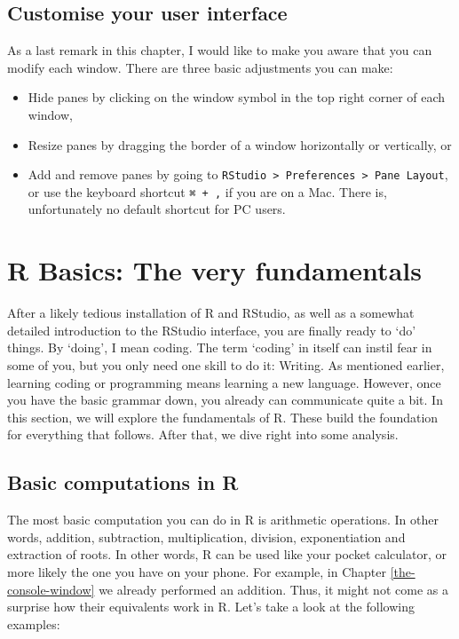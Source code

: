 \documentclass[
]{book}
\begin{document}
\hypertarget{customise-your-user-interface}{%
\section{Customise your user interface}\label{customise-your-user-interface}}

As a last remark in this chapter, I would like to make you aware that you can modify each window. There are three basic adjustments you can make:

\begin{itemize}
\item
  Hide panes by clicking on the window symbol in the top right corner of each window,
\item
  Resize panes by dragging the border of a window horizontally or vertically, or
\item
  Add and remove panes by going to \texttt{RStudio\ \textgreater{}\ Preferences\ \textgreater{}\ Pane\ Layout}, or use the keyboard shortcut \texttt{⌘\ +\ ,} if you are on a Mac. There is, unfortunately no default shortcut for PC users.
\end{itemize}

\hypertarget{r-basics-the-very-fundamentals}{%
\chapter{R Basics: The very fundamentals}\label{r-basics-the-very-fundamentals}}

After a likely tedious installation of R and RStudio, as well as a somewhat detailed introduction to the RStudio interface, you are finally ready to `do' things. By `doing', I mean coding. The term `coding' in itself can instil fear in some of you, but you only need one skill to do it: Writing. As mentioned earlier, learning coding or programming means learning a new language. However, once you have the basic grammar down, you already can communicate quite a bit. In this section, we will explore the fundamentals of R. These build the foundation for everything that follows. After that, we dive right into some analysis.

\hypertarget{basic-computations-in-r}{%
\section{Basic computations in R}\label{basic-computations-in-r}}

The most basic computation you can do in R is arithmetic operations. In other words, addition, subtraction, multiplication, division, exponentiation and extraction of roots. In other words, R can be used like your pocket calculator, or more likely the one you have on your phone. For example, in Chapter \ref{the-console-window} we already performed an addition. Thus, it might not come as a surprise how their equivalents work in R. Let's take a look at the following examples:
\end{document}
